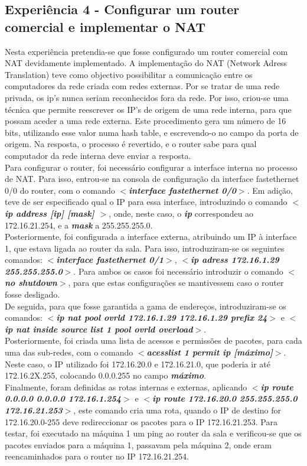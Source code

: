 \documentclass[a4paper]{article}
\begin{document}
\subsection{Experiência 4 - Configurar um router comercial e implementar o NAT}
Nesta experiência pretendia-se que fosse configurado um router comercial com NAT devidamente implementado. A implementação do NAT (Network Adress Translation) teve como objectivo possibilitar a comunicação entre os computadores da rede criada com redes externas. Por se tratar de uma rede privada, os ip’s nunca seriam reconhecidos fora da rede. Por isso, criou-se uma técnica que permite reescrever os IP’s de origem  de uma rede interna, para que possam aceder a uma rede externa. Este procedimento gera um número de 16 bits, utilizando esse valor numa hash table, e escrevendo-o no campo da porta de origem. Na resposta, o processo é revertido, e o router sabe para qual computador da rede interna deve enviar a resposta.\\
Para configurar o router, foi necessário configurar a interface interna no processo de NAT. Para isso, entrou-se na consola de configuração da interface fastethernet 0/0 do router, com o comando \textbf{\textit{$<$interface fastethernet 0/0$>$}}. Em adição, teve de ser especificado qual o IP para essa interface, introduzindo o comando\textbf{ \textit{$<$ ip address [ip] [mask] $>$}}, onde, neste caso, o \textbf{\textit{ip}} correspondeu ao 172.16.21.254, e a \textbf{\textit{mask}} a 255.255.255.0.\\
Posteriormente, foi configurada a interface externa, atribuindo um IP à interface 1, que estava ligada ao router da sala. Para isso, introduziram-se os seguintes comandos: \textbf{\textit{$<$interface fastethernet 0/1$>$}}, \textbf{\textit{$<$ip adress 172.16.1.29 255.255.255.0$>$}}. Para ambos os casos foi necessário introduzir o comando \textbf{\textit{$<$no shutdown$>$}}, para que estas configurações se mantivessem caso o router fosse desligado.\\
De seguida, para que fosse garantida a gama de endereços, introduziram-se os comandos: \textbf{\textit{$<$ip nat pool ovrld 172.16.1.29 172.16.1.29 prefix 24$>$}} e \textbf{\textit{$<$ip nat inside source list 1 pool ovrld overload$>$}}.\\
Posteriormente, foi criada uma lista de acessos e permissões de pacotes, para cada uma das sub-redes, com o comando \textbf{\textit{$<$acesslist 1 permit ip [máximo]$>$}}. Neste caso, o IP utilizado foi 172.16.20.0 e 172.16.21.0, que poderia ir até 172.16.2X.255, colocando 0.0.0.255 no campo \textbf{\textit{máximo}}.\\
Finalmente, foram definidas as rotas internas e externas, aplicando \textbf{\textit{$<$ip route 0.0.0.0
0.0.0.0 172.16.1.254$>$}} e \textbf{\textit{$<$ip route 172.16.20.0 255.255.255.0 172.16.21.253$>$}}, este comando cria uma rota, quando o IP de destino for 172.16.20.0-255 deve redireccionar os pacotes para o IP 172.16.21.253.
Para testar, foi executado na máquina 1 um ping ao router da sala e verificou-se que os pacotes enviados para a máquina 1, passavam pela máquina 2, onde eram reencaminhados para o router no IP 172.16.21.254.
\end{document}
